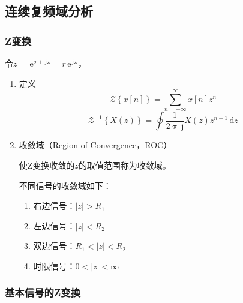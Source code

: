 \documentclass[UTF8,fontset=fandol,zihao=5]{ctexart}
\newcommand{\jj}{\,\mathrm{j}}
\newcommand{\ee}{\,\mathrm{e}}
\newcommand{\dd}{\,\mathrm{d}}
\newcommand{\zf}{\mathcal{Z}}
\begin{document}
\subsection{连续复频域分析}

\subsubsection{Z变换}

令$z=\ee^{\sigma + \jj \omega}=r\ee^{\jj \omega}$，

\begin{enumerate}
  \item 定义
\[
\zf\left\{x[n]\right\}=\sum_{n=-\infty}^{\infty} x[n] z^n
\]
\[
\zf^{-1}\left\{X(z)\right\}=\oint\frac{1}{2\uppi\jj} X(z) z^{n-1} \dd z
\]

  \item 收敛域（Region of Convergence，ROC）
  
  使Z变换收敛的$z$的取值范围称为收敛域。

  不同信号的收敛域如下：
  \begin{enumerate}[label=(\arabic*)]
    \item 右边信号：$|z|>R_1$
    \item 左边信号：$|z|<R_2$
    \item 双边信号：$R_1<|z|<R_2$
    \item 时限信号：$0<|z|<\infty$
  \end{enumerate}
\end{enumerate}

\subsubsection{基本信号的Z变换}
\end{document}
